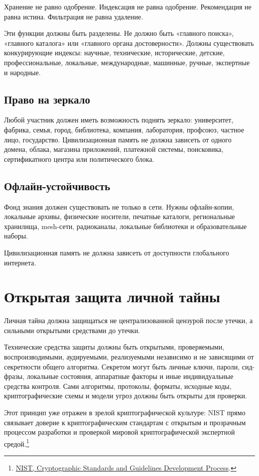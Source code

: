 \documentclass[11pt,a4paper]{article}
\begin{document}
Хранение не равно одобрение. Индексация не равна одобрение. Рекомендация не равна истина. Фильтрация не равна удаление.

Эти функции должны быть разделены. Не должно быть «главного поиска», «главного каталога» или «главного органа достоверности». Должны существовать конкурирующие индексы: научные, технические, исторические, детские, профессиональные, локальные, международные, машинные, ручные, экспертные и народные.

\subsection{Право на зеркало}

Любой участник должен иметь возможность поднять зеркало: университет, фабрика, семья, город, библиотека, компания, лаборатория, профсоюз, частное лицо, государство. Цивилизационная память не должна зависеть от одного домена, облака, магазина приложений, платежной системы, поисковика, сертификатного центра или политического блока.

\subsection{Офлайн-устойчивость}

Фонд знания должен существовать не только в сети. Нужны офлайн-копии, локальные архивы, физические носители, печатные каталоги, региональные хранилища, mesh-сети, радиоканалы, локальные библиотеки и образовательные наборы.

Цивилизационная память не должна зависеть от доступности глобального интернета.

\section{Открытая защита личной тайны}

Личная тайна должна защищаться не централизованной цензурой после утечки, а сильными открытыми средствами до утечки.

Технические средства защиты должны быть открытыми, проверяемыми, воспроизводимыми, аудируемыми, реализуемыми независимо и не зависящими от секретности общего алгоритма. Секретом могут быть личные ключи, пароли, сид-фразы, локальные состояния, аппаратные факторы и иные индивидуальные средства контроля. Сами алгоритмы, протоколы, форматы, исходные коды, криптографические схемы и модели угроз должны быть открыты для проверки.

Этот принцип уже отражен в зрелой криптографической культуре: NIST прямо связывает доверие к криптографическим стандартам с открытым и прозрачным процессом разработки и проверкой мировой криптографической экспертной средой.\footnote{\href{https://csrc.nist.gov/projects/crypto-standards-development-process}{NIST, Cryptographic Standards and Guidelines Development Process}.}
\end{document}
